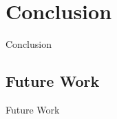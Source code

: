 \section{Conclusion}
\begin{frame}{Conclusion}

\end{frame}


\subsection{Future Work}
\begin{frame}{Future Work}

\end{frame}